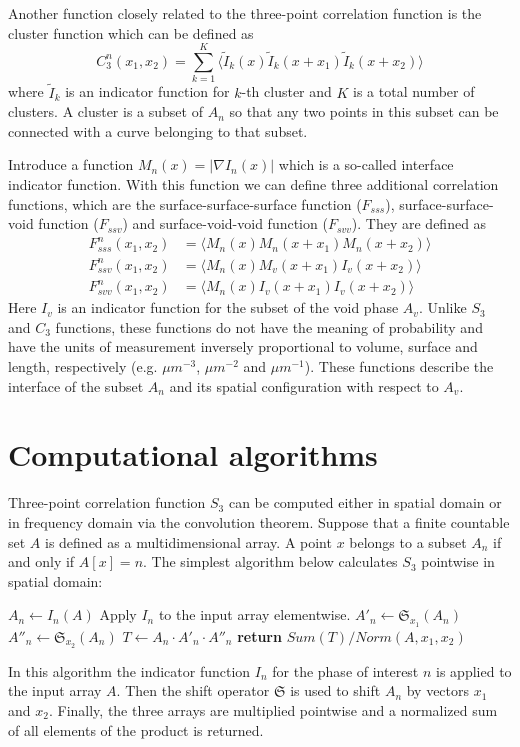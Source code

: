\documentclass[1p]{elsarticle}
\begin{document}
Another function closely related to the three-point correlation function is the
cluster function which can be defined as
\begin{equation}
  C_3^n(x_1, x_2) = \sum_{k=1}^K \langle \tilde{I}_k(x) \tilde{I}_k(x + x_1)
  \tilde{I}_k(x + x_2) \rangle
\end{equation}
where $\tilde{I}_k$ is an indicator function for $k$-th cluster and $K$ is a
total number of clusters. A cluster is a subset of $A_n$ so that any two points
in this subset can be connected with a curve belonging to that subset.

Introduce a function $M_n(x) = |\nabla I_n(x)|$ which is a so-called interface
indicator function. With this function we can define three additional
correlation functions, which are the surface-surface-surface function
($F_{sss}$), surface-surface-void function ($F_{ssv}$) and surface-void-void
function ($F_{svv}$). They are defined as
\begin{align}
  F_{sss}^n(x_1, x_2) &= \langle M_n(x) M_n(x + x_1) M_n(x + x_2) \rangle \\
  F_{ssv}^n(x_1, x_2) &= \langle M_n(x) M_v(x + x_1) I_v(x + x_2) \rangle \\
  F_{svv}^n(x_1, x_2) &= \langle M_n(x) I_v(x + x_1) I_v(x + x_2) \rangle
\end{align}
Here $I_v$ is an indicator function for the subset of the void phase
$A_v$. Unlike $S_3$ and $C_3$ functions, these functions do not have the meaning
of probability and have the units of measurement inversely proportional to
volume, surface and length, respectively (e.g. $\mu m^{-3}$, $\mu m^{-2}$ and
$\mu m^{-1}$). These functions describe the interface of the subset $A_n$ and
its spatial configuration with respect to $A_v$.

\section{Computational algorithms}
Three-point correlation function $S_3$ can be computed either in spatial domain
or in frequency domain via the convolution theorem. Suppose that a finite
countable set $A$ is defined as a multidimensional array. A point $x$ belongs to
a subset $A_n$ if and only if $A[x] = n$. The simplest algorithm below
calculates $S_3$ pointwise in spatial domain:
\begin{algorithmic}[1]
  \State $A_n \gets I_n (A)$
  \Comment Apply $I_n$ to the input array elementwise.
  \State $A'_n \gets \mathfrak{S}_{x_1}(A_n)$
  \State $A''_n \gets \mathfrak{S}_{x_2}(A_n)$
  \State $T \gets A_n \cdot A'_n \cdot A''_n$
  \State \textbf{return} $Sum(T) / Norm(A, x_1, x_2)$
  \EndProcedure
\end{algorithmic}
In this algorithm the indicator function $I_n$ for the phase of interest $n$ is
applied to the input array $A$. Then the shift operator $\mathfrak{S}$ is used
to shift $A_n$ by vectors $x_1$ and $x_2$. Finally, the three arrays are
multiplied pointwise and a normalized sum of all elements of the product is
returned.
\end{document}
